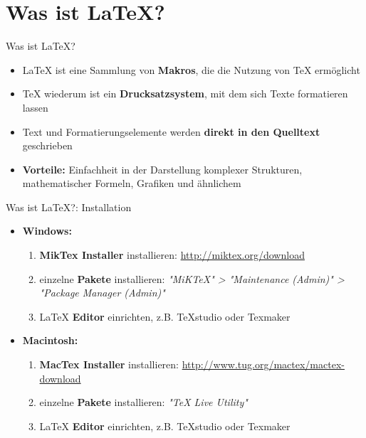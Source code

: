 \section{Was ist \LaTeX?}

\begin{frame}{Was ist \LaTeX?}
\begin{itemize}
    \item \LaTeX{} ist eine Sammlung von \textbf{Makros}, die die Nutzung von \TeX{} ermöglicht
    \newline
    \item \TeX{} wiederum ist ein \textbf{Drucksatzsystem}, mit dem sich Texte formatieren lassen
    \newline
    \item Text und Formatierungselemente werden \textbf{direkt in den Quelltext} geschrieben
    \newline
    \item \textbf{Vorteile:} Einfachheit in der Darstellung komplexer Strukturen, mathematischer Formeln, Grafiken und ähnlichem
\end{itemize}
    
\end{frame}

\begin{frame}{Was ist \LaTeX?: Installation}
\begin{itemize}
\item \textbf{Windows:}
\begin{enumerate}
\item \textbf{MikTex Installer} installieren: \url{http://miktex.org/download}
\item einzelne \textbf{Pakete} installieren: \textit{"MiKTeX" > "Maintenance (Admin)" > "Package Manager (Admin)"}
\item \LaTeX{} \textbf{Editor} einrichten, z.B. TeXstudio oder Texmaker
\end{enumerate}
\item \textbf{Macintosh:}
\begin{enumerate}
\item \textbf{MacTex Installer} installieren: \url{http://www.tug.org/mactex/mactex-download}
\item einzelne \textbf{Pakete} installieren: \textit{"TeX Live Utility"}
\item \LaTeX{} \textbf{Editor} einrichten, z.B. TeXstudio oder Texmaker
\end{enumerate}
\end{itemize}
\end{frame}

